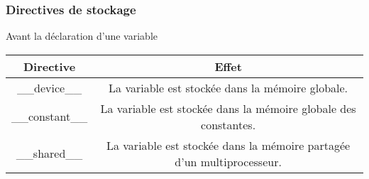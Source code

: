 \begin{frame}
    \frametitle{Directives de stockage}
\begin{block}{Avant la déclaration d'une variable}
    \renewcommand{\arraystretch}{2.5}
    \vskip 20pt
    \begin{tabular}{|c|c|}
        \hline
        \rowcolor{lightgray} Directive & Effet \\ \hline
        \_\_device\_\_ & \begin{minipage}{0.8\textwidth}
            La variable est stockée dans la mémoire globale. 
        \end{minipage} \\ \hline
        \_\_constant\_\_ & \begin{minipage}{0.8\textwidth}
            La variable est stockée dans la mémoire globale des constantes.
        \end{minipage} \\ \hline
        \_\_shared\_\_ & \begin{minipage}{0.8\textwidth}
            La variable est stockée dans la mémoire partagée d'un multiprocesseur.
        \end{minipage} \\ \hline
    \end{tabular}
\end{block}
\end{frame}

